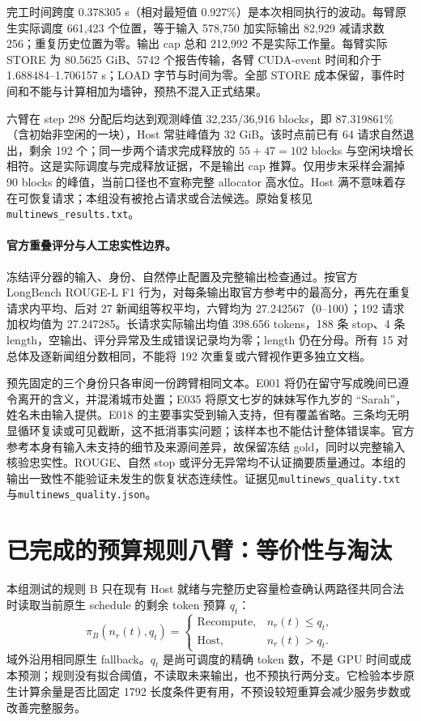 \documentclass[UTF8,fontset=fandol,a4paper,10pt]{ctexart}
\newcommand{\code}[1]{\nolinkurl{#1}}
\begin{document}
完工时间跨度 0.378305 s（相对最短值 0.927\%）是本次相同执行的波动。每臂原生实际调度 661,423 个位置，等于输入 578,750 加实际输出 82,929 减请求数 256；重复历史位置为零。输出 cap 总和 212,992 不是实际工作量。每臂实际 STORE 为 80.5625 GiB、5742 个报告传输，各臂 CUDA-event 时间和介于 1.688484--1.706157 s；LOAD 字节与时间为零。全部 STORE 成本保留，事件时间和不能与计算相加为墙钟，预热不混入正式结果。

六臂在 step 298 分配后均达到观测峰值 32,235/36,916 blocks，即 87.319861\%（含初始非空闲的一块），Host 常驻峰值为 32 GiB。该时点前已有 64 请求自然退出，剩余 192 个；同一步两个请求完成释放的 $55+47=102$ blocks 与空闲块增长相符。这是实际调度与完成释放证据，不是输出 cap 推算。仅用步末采样会漏掉 90 blocks 的峰值，当前口径也不宣称完整 allocator 高水位。Host 满不意味着存在可恢复请求；本组没有被抢占请求或合法候选。原始复核见\code{multinews_results.txt}。

\paragraph{官方重叠评分与人工忠实性边界。}
冻结评分器的输入、身份、自然停止配置及完整输出检查通过。按官方 LongBench ROUGE-L F1 行为，对每条输出取官方参考中的最高分，再先在重复请求内平均、后对 27 新闻组等权平均，六臂均为 27.242567（0--100）；192 请求加权均值为 27.247285。长请求实际输出均值 398.656 tokens，188 条 stop、4 条 length，空输出、评分异常及生成错误记录均为零；length 仍在分母。所有 15 对总体及逐新闻组分数相同，不能将 192 次重复或六臂视作更多独立文档。

预先固定的三个身份只各审阅一份跨臂相同文本。E001 将仍在留守写成晚间已遵令离开的含义，并混淆城市处置；E035 将原文七岁的妹妹写作九岁的 ``Sarah''，姓名未由输入提供。E018 的主要事实受到输入支持，但有覆盖省略。三条均无明显循环复读或可见截断，这不抵消事实问题；该样本也不能估计整体错误率。官方参考本身有输入未支持的细节及来源间差异，故保留冻结 gold，同时以完整输入核验忠实性。ROUGE、自然 stop 或评分无异常均不认证摘要质量通过。本组的输出一致性不能验证未发生的恢复状态连续性。证据见\code{multinews_quality.txt} 与\code{multinews_quality.json}。

\section{已完成的预算规则八臂：等价性与淘汰}
\label{sec:budget-next}
本组测试的规则 B 只在现有 Host 就绪与完整历史容量检查确认两路径共同合法时读取当前原生 schedule 的剩余 token 预算 $q_t$：
\begin{equation}
 \pi_B(n_r(t),q_t)=
 \begin{cases}\mathrm{Recompute},&n_r(t)\le q_t,\\
 \mathrm{Host},&n_r(t)>q_t.
 \end{cases}
\end{equation}
域外沿用相同原生 fallback。$q_t$ 是尚可调度的精确 token 数，不是 GPU 时间或成本预测；规则没有拟合阈值，不读取未来输出，也不预执行两分支。它检验本步原生计算余量是否比固定 1792 长度条件更有用，不预设较短重算会减少服务步数或改善完整服务。
\end{document}
